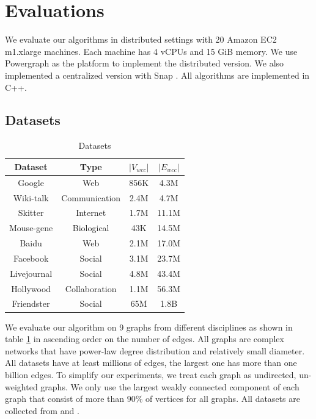 \section{Evaluations}
\label{evaluation}

We evaluate our algorithms in distributed settings with 20 Amazon EC2 m1.xlarge machines. Each machine has 4 vCPUs and 15 GiB memory. We use Powergraph \cite{180251} as the platform to implement the distributed version. We also implemented a centralized version with Snap \cite{snapnets}. All algorithms are implemented in C++.

\subsection{Datasets}

\begin{table}
    \centering
    \begin{tabular}{|c|c|c|c|} \hline
        Dataset & Type & $|V_{wcc}|$ & $|E_{wcc}|$ \\ \hline
        Google & Web & 856K & 4.3M \\ \hline
				Wiki-talk & Communication & 2.4M & 4.7M \\ \hline
        Skitter & Internet & 1.7M & 11.1M \\ \hline
        Mouse-gene & Biological & 43K & 14.5M \\ \hline
				Baidu & Web & 2.1M & 17.0M \\ \hline
        Facebook & Social & 3.1M & 23.7M \\ \hline
        Livejournal & Social & 4.8M & 43.4M \\ \hline
        Hollywood & Collaboration & 1.1M & 56.3M \\ \hline
        Friendster & Social & 65M & 1.8B \\ \hline
    \end{tabular}
    \caption{Datasets}
    \label{table:datasets}
\end{table}

We evaluate our algorithm on 9 graphs from different disciplines as shown in table \ref{table:datasets} in ascending order on the number of edges. All graphs are complex networks that have power-law degree distribution and relatively small diameter. All datasets have at least millions of edges, the largest one has more than one billion edges. To simplify our experiments, we treat each graph as undirected, un-weighted graphs. We only use the largest weakly connected component of each graph that consist of more than $90\%$ of vertices for all graphs. All datasets are collected from \cite{snapnets} and \cite{nr}.

